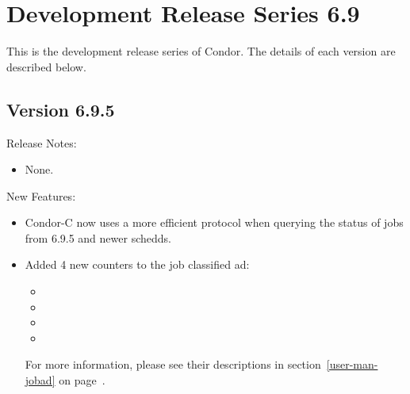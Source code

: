 
\section{\label{sec:History-6-9}Development Release Series 6.9}

This is the development release series of Condor.
The details of each version are described below.

\subsection*{\label{sec:New-6-9-5}Version 6.9.5}

\noindent Release Notes:

\begin{itemize}

\item None.

\end{itemize}


\noindent New Features:

\begin{itemize}

\item Condor-C now uses a more efficient protocol when querying the
status of jobs from 6.9.5 and newer schedds.

\item Added 4 new counters to the job classified ad:
 \begin{itemize}
 \item {}
 \item {}
 \item {}
 \item {}
 \end{itemize}
For more information, please see their descriptions in
section~\ref{user-man-jobad} on page~\pageref{user-man-jobad}.

\end{itemize}

